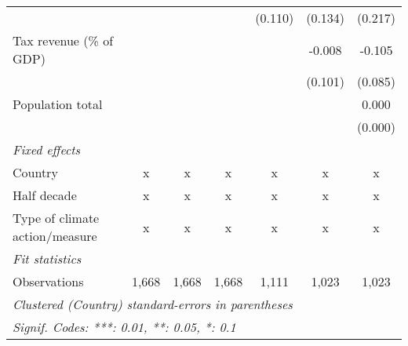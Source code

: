 \begin{tabular}{lcccccc}
                                                                   &         &         &                & (0.110)       & (0.134)       & (0.217)\\   
   Tax revenue (\% of GDP)                                         &         &         &                &               & -0.008        & -0.105\\   
                                                                   &         &         &                &               & (0.101)       & (0.085)\\   
   Population total                                                &         &         &                &               &               & 0.000\\   
                                                                   &         &         &                &               &               & (0.000)\\   
   \emph{Fixed effects}\\
   Country                                                         & x       & x       & x              & x             & x             & x\\  
   Half decade                                                     & x       & x       & x              & x             & x             & x\\  
   Type of climate action/measure                                  & x       & x       & x              & x             & x             & x\\  
   \midrule \emph{Fit statistics}\\
   Observations                                                    & 1,668   & 1,668   & 1,668          & 1,111         & 1,023         & 1,023\\  
   \midrule
   \multicolumn{7}{l}{\emph{Clustered (Country) standard-errors in parentheses}}\\
   \multicolumn{7}{l}{\emph{Signif. Codes: ***: 0.01, **: 0.05, *: 0.1}}\\
\end{tabular}
\par\endgroup


